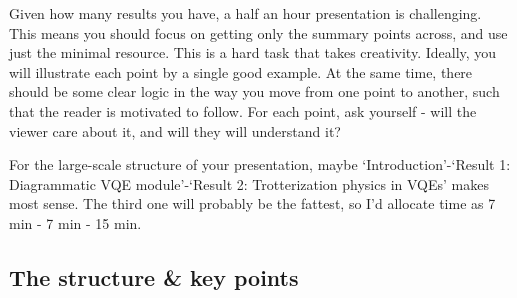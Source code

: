 \documentclass[10pt, a4paper]{article}
\begin{document}
Given how many results you have, a half an hour presentation is challenging. This means you should focus on getting only the summary points across, and use just the minimal resource. This is a hard task that takes creativity. Ideally, you will illustrate each point by a single good example. At the same time, there should be some clear logic in the way you move from one point to another, such that the reader is motivated to follow. For each point, ask yourself - will the viewer care about it, and will they will understand it?

For the large-scale structure of your presentation, maybe `Introduction'-`Result 1: Diagrammatic VQE module'-`Result 2: Trotterization physics in VQEs' makes most sense. The third one will probably be the fattest, so I'd allocate time as 7 min - 7 min - 15 min. 

\subsection*{The structure \& key points}
\end{document}
